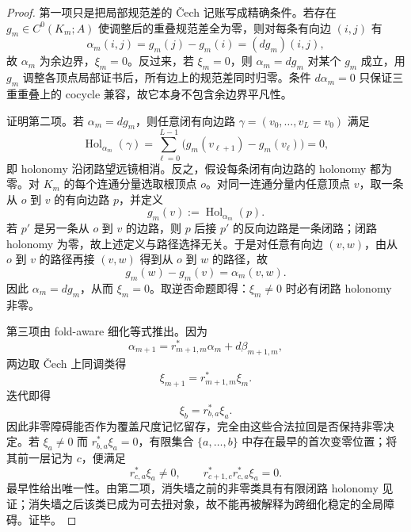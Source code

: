 \begin{proof}
第一项只是把局部规范差的 \v Cech 记账写成精确条件。若存在 \(g_m\in C^0(K_m;A)\) 使调整后的重叠规范差全为零，则对每条有向边 \((i,j)\) 有
\[
\alpha_m(i,j)=g_m(j)-g_m(i)=(dg_m)(i,j),
\]
故 \(\alpha_m\) 为余边界，\(\xi_m=0\)。反过来，若 \(\xi_m=0\)，则 \(\alpha_m=dg_m\) 对某个 \(g_m\) 成立，用 \(g_m\) 调整各顶点局部证书后，所有边上的规范差同时归零。条件 \(d\alpha_m=0\) 只保证三重重叠上的 cocycle 兼容，故它本身不包含余边界平凡性。

证明第二项。若 \(\alpha_m=dg_m\)，则任意闭有向边路 \(\gamma=(v_0,\dots,v_L=v_0)\) 满足
\[
\operatorname{Hol}_{\alpha_m}(\gamma)
=\sum_{\ell=0}^{L-1}\bigl(g_m(v_{\ell+1})-g_m(v_\ell)\bigr)=0,
\]
即 holonomy 沿闭路望远镜相消。反之，假设每条闭有向边路的 holonomy 都为零。对 \(K_m\) 的每个连通分量选取根顶点 \(o\)。对同一连通分量内任意顶点 \(v\)，取一条从 \(o\) 到 \(v\) 的有向边路 \(p\)，并定义
\[
g_m(v):=\operatorname{Hol}_{\alpha_m}(p).
\]
若 \(p'\) 是另一条从 \(o\) 到 \(v\) 的边路，则 \(p\) 后接 \(p'\) 的反向边路是一条闭路；闭路 holonomy 为零，故上述定义与路径选择无关。于是对任意有向边 \((v,w)\)，由从 \(o\) 到 \(v\) 的路径再接 \((v,w)\) 得到从 \(o\) 到 \(w\) 的路径，故
\[
g_m(w)-g_m(v)=\alpha_m(v,w).
\]
因此 \(\alpha_m=dg_m\)，从而 \(\xi_m=0\)。取逆否命题即得：\(\xi_m\neq0\) 时必有闭路 holonomy 非零。

第三项由 fold-aware 细化等式推出。因为
\[
\alpha_{m+1}=r_{m+1,m}^{*}\alpha_m+d\beta_{m+1,m},
\]
两边取 \v Cech 上同调类得
\[
\xi_{m+1}=r_{m+1,m}^{*}\xi_m.
\]
迭代即得
\[
\xi_b=r_{b,a}^{*}\xi_a.
\]
因此非零障碍能否作为覆盖尺度记忆留存，完全由这些合法拉回是否保持非零决定。若 \(\xi_a\neq0\) 而 \(r_{b,a}^{*}\xi_a=0\)，有限集合 \(\{a,\dots,b\}\) 中存在最早的首次变零位置；将其前一层记为 \(c\)，便满足
\[
r_{c,a}^{*}\xi_a\neq0,
\qquad
r_{c+1,c}^{*}r_{c,a}^{*}\xi_a=0.
\]
最早性给出唯一性。由第二项，消失墙之前的非零类具有有限闭路 holonomy 见证；消失墙之后该类已成为可去扭对象，故不能再被解释为跨细化稳定的全局障碍。证毕。
\end{proof}

